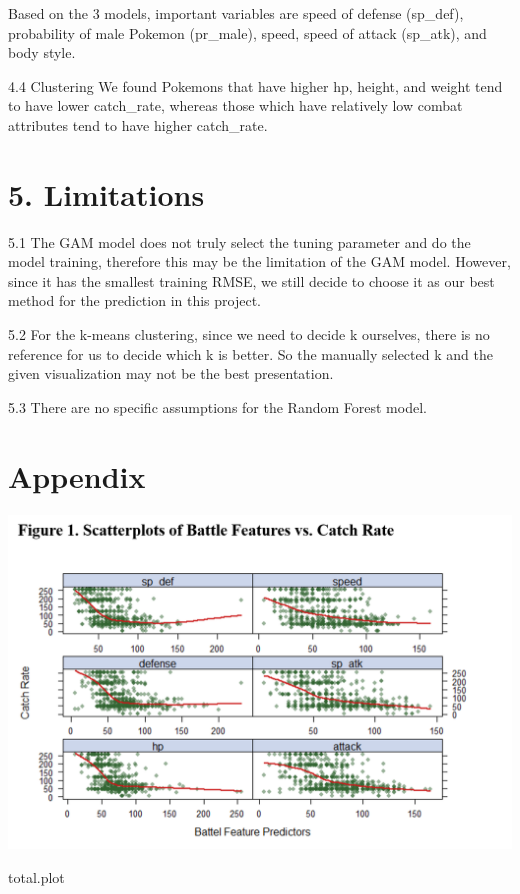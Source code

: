 \documentclass[
]{article}
\newenvironment{Shaded}{\begin{snugshade}}{\end{snugshade}}
\newcommand{\NormalTok}[1]{#1}
\begin{document}
Based on the 3 models, important variables are speed of defense
(sp\_def), probability of male Pokemon (pr\_male), speed, speed of
attack (sp\_atk), and body style.

4.4 Clustering We found Pokemons that have higher hp, height, and weight
tend to have lower catch\_rate, whereas those which have relatively low
combat attributes tend to have higher catch\_rate.

\hypertarget{limitations}{%
\section{5. Limitations}\label{limitations}}

5.1 The GAM model does not truly select the tuning parameter and do the
model training, therefore this may be the limitation of the GAM model.
However, since it has the smallest training RMSE, we still decide to
choose it as our best method for the prediction in this project.

5.2 For the k-means clustering, since we need to decide k ourselves,
there is no reference for us to decide which k is better. So the
manually selected k and the given visualization may not be the best
presentation.

5.3 There are no specific assumptions for the Random Forest model.

\hypertarget{appendix}{%
\section{Appendix}\label{appendix}}

\includegraphics{anno_fig/fig1.png}

\begin{Shaded}
\begin{Highlighting}[]
\NormalTok{total.plot}
\end{Highlighting}
\end{Shaded}
\end{document}
